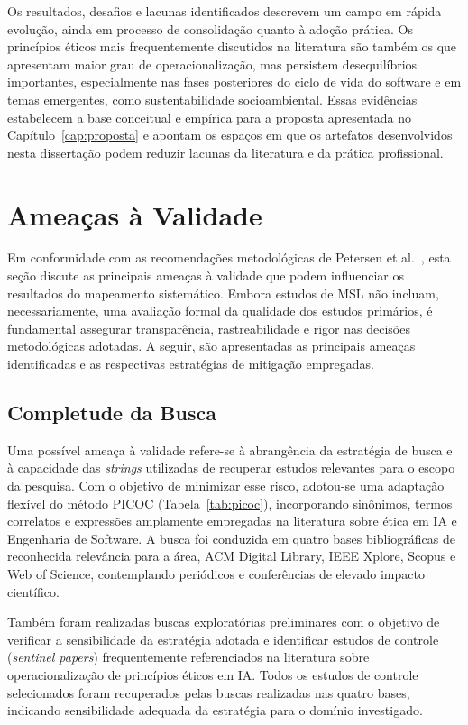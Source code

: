 Os resultados, desafios e lacunas identificados descrevem um campo em rápida evolução, ainda em processo de consolidação quanto à adoção prática. Os princípios éticos mais frequentemente discutidos na literatura são também os que apresentam maior grau de operacionalização, mas persistem desequilíbrios importantes, especialmente nas fases posteriores do ciclo de vida do software e em temas emergentes, como sustentabilidade socioambiental. Essas evidências estabelecem a base conceitual e empírica para a proposta apresentada no Capítulo~\ref{cap:proposta} e apontam os espaços em que os artefatos desenvolvidos nesta dissertação podem reduzir lacunas da literatura e da prática profissional.

\section{Ameaças à Validade}
\label{sec:threats}

Em conformidade com as recomendações metodológicas de Petersen et al.~\cite{Petersen2015}, esta seção discute as principais ameaças à validade que podem influenciar os resultados do mapeamento sistemático. Embora estudos de MSL não incluam, necessariamente, uma avaliação formal da qualidade dos estudos primários, é fundamental assegurar transparência, rastreabilidade e rigor nas decisões metodológicas adotadas. A seguir, são apresentadas as principais ameaças identificadas e as respectivas estratégias de mitigação empregadas.

\subsection{Completude da Busca}

Uma possível ameaça à validade refere-se à abrangência da estratégia de busca e à capacidade das \textit{strings} utilizadas de recuperar estudos relevantes para o escopo da pesquisa. Com o objetivo de minimizar esse risco, adotou-se uma adaptação flexível do método PICOC (Tabela~\ref{tab:picoc}), incorporando sinônimos, termos correlatos e expressões amplamente empregadas na literatura sobre ética em IA e Engenharia de Software. A busca foi conduzida em quatro bases bibliográficas de reconhecida relevância para a área, ACM Digital Library, IEEE Xplore, Scopus e Web of Science, contemplando periódicos e conferências de elevado impacto científico.

Também foram realizadas buscas exploratórias preliminares com o objetivo de verificar a sensibilidade da estratégia adotada e identificar estudos de controle (\textit{sentinel papers}) frequentemente referenciados na literatura sobre operacionalização de princípios éticos em IA. Todos os estudos de controle selecionados foram recuperados pelas buscas realizadas nas quatro bases, indicando sensibilidade adequada da estratégia para o domínio investigado.

